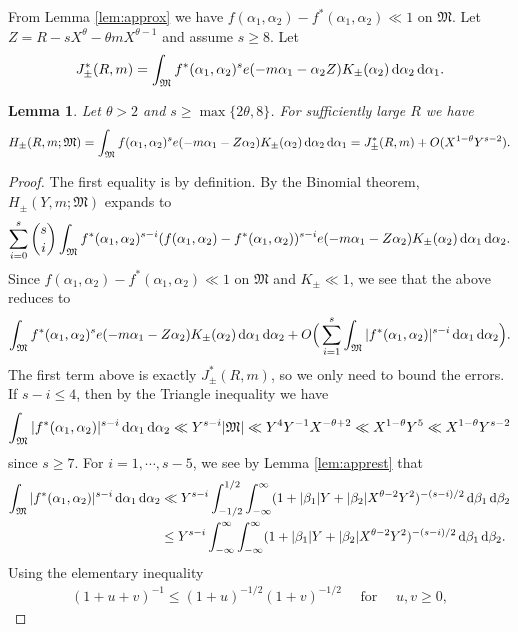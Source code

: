 \documentclass[11pt,reqno]{amsart}
\numberwithin{equation}{section}
\newtheorem{lemma}{Lemma}[section]
\renewcommand{\d}{\,{\rm d}}
\begin{document}
From Lemma \ref{lem:approx} we have $f(\alpha_1,\alpha_2) -f^*(\alpha_1,\alpha_2) \ll 1$ on $\mathfrak{M}$. Let $Z = R-sX^{\theta}-\theta m X^{\theta-1}$ and assume $s \geq 8$. Let 
\[ J_{\pm}^*(R,m) = \int_{\mathfrak{M}} f^*(\alpha_1, \alpha_2)^se(-m\alpha_1-\alpha_2Z)K_{\pm}(\alpha_2)\d\alpha_2 \d\alpha_1. \]
\begin{lemma} \label{lem:intapprox}
Let $\theta > 2$ and $s \geq \max\{2\theta,8\}$. For sufficiently large $R$ we have 
\[ H_{\pm}(R,m;\mathfrak{M}) = \int_{\mathfrak{M}} f(\alpha_1, \alpha_2)^se(-m\alpha_1-Z\alpha_2)K_{\pm}(\alpha_2)\d\alpha_2\d\alpha_1 = J_{\pm}^*(R,m) +O(X^{1-\theta}Y^{s-2}). \]
\end{lemma}

\begin{proof} The first equality is by definition. By the Binomial theorem, $H_{\pm}(Y,m;\mathfrak{M})$ expands to 
\[ \sum_{i=0}^s \binom{s}{i} \int_{\mathfrak{M}} f^*(\alpha_1,\alpha_2)^{s-i}(f(\alpha_1,\alpha_2)-f^*(\alpha_1,\alpha_2))^{s-i}e(-m\alpha_1-Z\alpha_2)K_{\pm}(\alpha_2)\d\alpha_1\d\alpha_2. \]
Since $f(\alpha_1, \alpha_2)-f^*(\alpha_1,\alpha_2) \ll 1$ on $\mathfrak{M}$ and $K_{\pm} \ll 1$, we see that the above reduces to 
\[ \int_{\mathfrak{M}} f^*(\alpha_1, \alpha_2)^se(-m\alpha_1-Z\alpha_2)K_{\pm}(\alpha_2)\d\alpha_1\d\alpha_2 +O\Big(\sum_{i=1}^s \int_{\mathfrak{M}} |f^*(\alpha_1,\alpha_2)|^{s-i}\d\alpha_1\d\alpha_2\Big). \]
The first term above is exactly $J_{\pm}^*(R,m)$, so we only need to bound the errors. If $s-i \leq 4$, then by the Triangle inequality we have 
\[ \int_{\mathfrak{M}} |f^*(\alpha_1,\alpha_2)|^{s-i}\d\alpha_1\d\alpha_2 \ll Y^{s-i}|\mathfrak{M}| \ll Y^4Y^{-1}X^{-\theta+2} \ll X^{1-\theta}Y^{5} \ll X^{1-\theta}Y^{s-2} \]
since $s \geq 7$.
For $i = 1, \cdots, s-5$, we see by Lemma \ref{lem:apprest} that 
\begin{equation} \label{eq:intbound}
\begin{aligned}
\int_{\mathfrak{M}}|f^*(\alpha_1, \alpha_2)|^{s-i} \d\alpha_1\d\alpha_2 & \ll 
Y^{s-i} \int_{-1/2}^{1/2} \int_{-\infty}^{\infty} (1+|\beta_1|Y+|\beta_2|X^{\theta-2}Y^2)^{-(s-i)/2}\d\beta_1\d\beta_2  
\\ & \leq Y^{s-i} \int_{-\infty}^{\infty} \int_{-\infty}^{\infty} (1+|\beta_1|Y+|\beta_2|X^{\theta-2}Y^2)^{-(s-i)/2}\d\beta_1\d\beta_2. 
\end{aligned}
\end{equation}
Using the elementary inequality 
\begin{align} \label{eq:elemineq}
(1+u+v)^{-1} \leq (1+u)^{-1/2}(1+v)^{-1/2} \quad \text{ for } \quad u,v \geq 0,

\end{align}
\end{proof}
\end{document}

